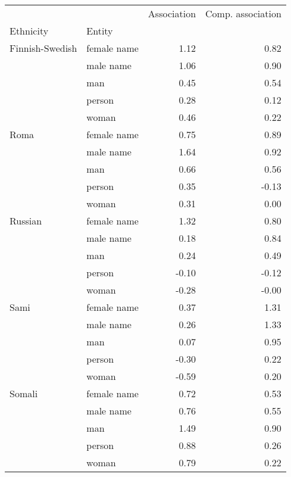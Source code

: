 \begin{tabular}{llrr}
\toprule
       &       &  Association &  Comp. association \\
Ethnicity & Entity &              &                    \\
\midrule
Finnish-Swedish & female name &         1.12 &               0.82 \\
       & male name &         1.06 &               0.90 \\
       & man &         0.45 &               0.54 \\
       & person &         0.28 &               0.12 \\
       & woman &         0.46 &               0.22 \\
Roma & female name &         0.75 &               0.89 \\
       & male name &         1.64 &               0.92 \\
       & man &         0.66 &               0.56 \\
       & person &         0.35 &              -0.13 \\
       & woman &         0.31 &               0.00 \\
Russian & female name &         1.32 &               0.80 \\
       & male name &         0.18 &               0.84 \\
       & man &         0.24 &               0.49 \\
       & person &        -0.10 &              -0.12 \\
       & woman &        -0.28 &              -0.00 \\
Sami & female name &         0.37 &               1.31 \\
       & male name &         0.26 &               1.33 \\
       & man &         0.07 &               0.95 \\
       & person &        -0.30 &               0.22 \\
       & woman &        -0.59 &               0.20 \\
Somali & female name &         0.72 &               0.53 \\
       & male name &         0.76 &               0.55 \\
       & man &         1.49 &               0.90 \\
       & person &         0.88 &               0.26 \\
       & woman &         0.79 &               0.22 \\
\bottomrule
\end{tabular}
